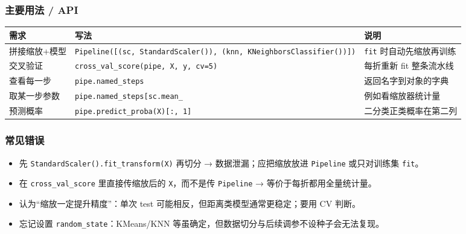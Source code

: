 \subsubsection{主要用法 / API}\label{ux4e3bux8981ux7528ux6cd5-api-32}

{\def\LTcaptype{none} %
\begin{longtable}[]{@{}
  >{\raggedright\arraybackslash}p{}
  >{\raggedright\arraybackslash}p{}
  >{\raggedright\arraybackslash}p{}@{}}
\toprule\noalign{}
\begin{minipage}[b]{\linewidth}\raggedright
需求
\end{minipage} & \begin{minipage}[b]{\linewidth}\raggedright
写法
\end{minipage} & \begin{minipage}[b]{\linewidth}\raggedright
说明
\end{minipage} \\
\midrule\noalign{}
\endhead
\bottomrule\noalign{}
\endlastfoot
拼接缩放+模型 &
\texttt{Pipeline({[}(\textquotesingle{}sc\textquotesingle{},\ StandardScaler()),\ (\textquotesingle{}knn\textquotesingle{},\ KNeighborsClassifier()){]})}
& \texttt{fit} 时自动先缩放再训练 \\
交叉验证 & \texttt{cross\_val\_score(pipe,\ X,\ y,\ cv=5)} & 每折重新
fit 整条流水线 \\
查看每一步 & \texttt{pipe.named\_steps} & 返回名字到对象的字典 \\
取某一步参数 &
\texttt{pipe.named\_steps{[}\textquotesingle{}sc\textquotesingle{}{]}.mean\_}
& 例如看缩放器统计量 \\
预测概率 & \texttt{pipe.predict\_proba(X){[}:,\ 1{]}} &
二分类正类概率在第二列 \\
\end{longtable}
}

\subsubsection{常见错误}\label{ux5e38ux89c1ux9519ux8bef-32}

\begin{itemize}
\tightlist
\item
  先 \texttt{StandardScaler().fit\_transform(X)} 再切分 →
  数据泄漏；应把缩放放进 \texttt{Pipeline} 或只对训练集 \texttt{fit}。
\item
  在 \texttt{cross\_val\_score} 里直接传缩放后的 \texttt{X}，而不是传
  \texttt{Pipeline} → 等价于每折都用全量统计量。
\item
  认为``缩放一定提升精度''：单次 test
  可能相反，但距离类模型通常更稳定；要用 CV 判断。
\item
  忘记设置 \texttt{random\_state}：KMeans/KNN
  等虽确定，但数据切分与后续调参不设种子会无法复现。
\end{itemize}

